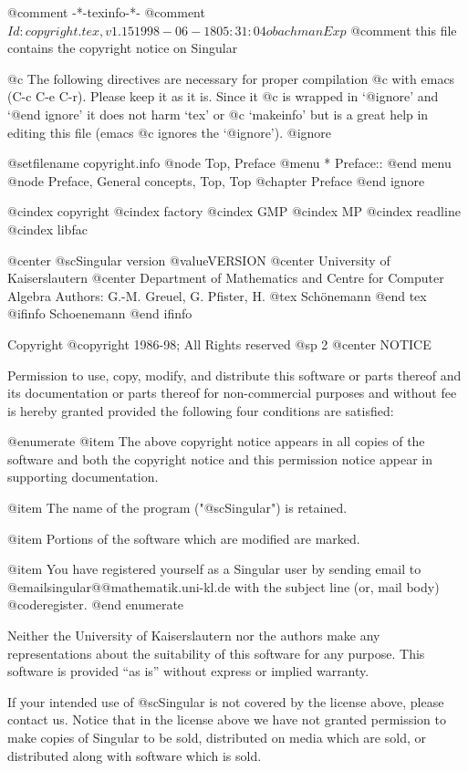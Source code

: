 @comment -*-texinfo-*-
@comment $Id: copyright.tex,v 1.15 1998-06-18 05:31:04 obachman Exp $
@comment this file contains the copyright notice on Singular

@c The following directives are necessary for proper compilation
@c with emacs (C-c C-e C-r).  Please keep it as it is.  Since it
@c is wrapped in `@ignore' and `@end ignore' it does not harm `tex' or
@c `makeinfo' but is a great help in editing this file (emacs
@c ignores the `@ignore').
@ignore

@setfilename copyright.info
@node Top, Preface
@menu
* Preface::
@end menu
@node Preface, General concepts, Top, Top
@chapter Preface
@end ignore

@cindex copyright
@cindex factory
@cindex GMP
@cindex MP
@cindex readline
@cindex libfac

@center @sc{Singular} version @value{VERSION}
@center University of Kaiserslautern
@center Department of Mathematics and Centre for Computer Algebra
Authors: G.-M. Greuel, G. Pfister, H.
@tex
Sch\"onemann
@end tex
@ifinfo
Schoenemann
@end ifinfo

Copyright @copyright{} 1986-98; All Rights reserved
@sp 2
                                @center NOTICE

Permission to use, copy, modify, and distribute this software or parts
thereof and its documentation or parts thereof for non-commercial
purposes and without fee is hereby granted provided the following four
conditions are satisfied:

@enumerate
@item
The above copyright notice appears in all copies of the software
and both the copyright notice and this permission notice
appear in supporting documentation.

@item
The name of the program ("@sc{Singular}") is retained.

@item
Portions of the software which are modified are marked.

@item 
You have registered yourself as a Singular user by sending email to
@email{singular@@mathematik.uni-kl.de} with the subject line (or, mail body)
@code{register}. 
@end enumerate

Neither the University of Kaiserslautern nor the authors make any
representations about the suitability of this software for any
purpose.  This software is provided ``as is'' without express or
implied warranty.

If your intended use of @sc{Singular} is not covered by the license above,
please contact us.  Notice that in the license above we have not
granted permission to make copies of Singular to be sold, distributed
on media which are sold, or distributed along with software which is
sold. 

